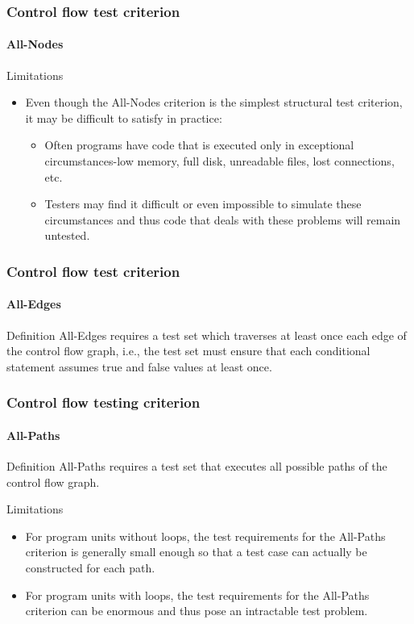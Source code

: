 \begin{frame}
\frametitle{Control flow test criterion}
\framesubtitle{All-Nodes}

\begin{block:fact}{Limitations}
\begin{itemize}
	\item Even though the All-Nodes criterion is the simplest structural test
	criterion, it may be difficult to satisfy in practice:
	\begin{itemize}
		\item Often programs have code that is executed only in exceptional
		circumstances-low memory, full disk, unreadable files, lost
		connections, etc.

		\item Testers may find it difficult or even impossible to simulate
		these circumstances and thus code that deals with these problems will
		remain untested.
	\end{itemize}
\end{itemize}
\end{block:fact}
\end{frame}



\begin{frame}
\label{concept:all-edges-criterion}
\label{concept:all-edges}
\frametitle{Control flow test criterion}
\framesubtitle{All-Edges}


\begin{block:concept}{Definition}
All-Edges requires a test set which traverses at least once each edge
of the control flow graph, i.e., the test set must ensure that each
conditional statement assumes true and false values at least once.
\end{block:concept}
\end{frame}


\begin{frame}[hasnext=false,hasprev=true]
\frametitle{Control flow testing criterion}
\framesubtitle{All-Paths}
\label{concept:all-paths-criterion}
\label{concept:all-paths}

\begin{block:concept}{Definition}
All-Paths requires a test set that executes all possible paths of the control
flow graph.
\end{block:concept}

\begin{block:fact}{Limitations}
\begin{itemize}
	\item For program units without loops, the test requirements for the
	All-Paths criterion is generally small enough so that a test case can
	actually be constructed for each path.

	\item For program units with loops, the test requirements for the All-Paths
	criterion can be enormous and thus pose an intractable test problem.
\end{itemize}
\end{block:fact}
\end{frame}
